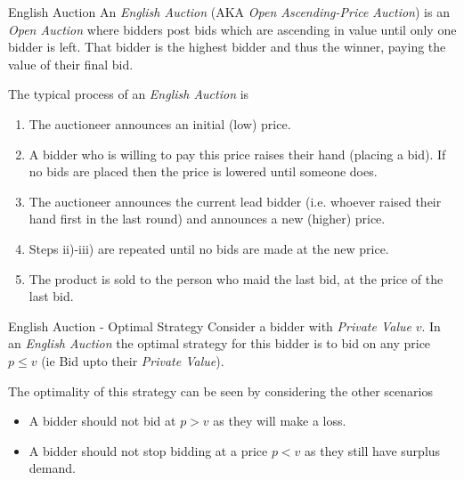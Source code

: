 \documentclass[11pt,a4paper]{article}
\begin{document}
  \begin{definition}{English Auction}
    An \textit{English Auction} (AKA \textit{Open Ascending-Price Auction}) is an \textit{Open Auction} where bidders post bids which are ascending in value until only one bidder is left. That bidder is the highest bidder and thus the winner, paying the value of their final bid.
    \par The typical process of an \textit{English Auction} is
    \begin{enumerate}
      \item The auctioneer announces an initial (low) price.
      \item A bidder who is willing to pay this price raises their hand (placing a bid). If no bids are placed then the price is lowered until someone does.
      \item The auctioneer announces the current lead bidder (i.e. whoever raised their hand first in the last round) and announces a new (higher) price.
      \item Steps ii)-iii) are repeated until no bids are made at the new price.
      \item The product is sold to the person who maid the last bid, at the price of the last bid.
    \end{enumerate}
  \end{definition}

  \begin{proposition}{English Auction - Optimal Strategy}
    Consider a bidder with \textit{Private Value} $v$. In an \textit{English Auction} the optimal strategy for this bidder is to bid on any price $p\leq v$ (ie Bid upto their \textit{Private Value}).
    \par The optimality of this strategy can be seen by considering the other scenarios
    \begin{itemize}
      \item A bidder should not bid at $p>v$ as they will make a loss.
      \item A bidder should not stop bidding at a price $p<v$ as they still have surplus demand.
    \end{itemize}
  \end{proposition}
\end{document}
